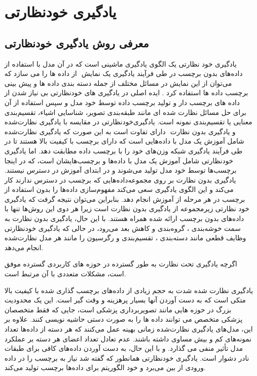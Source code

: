 \clearpage
{}
\chapter{یادگیری خودنظارتی}

\section{معرفی روش یادگیری خودنظارتی}

یادگیری خود نظارتی یک الگوی یادگیری ماشینی است که در آن مدل با استفاده از داده‌های بدون برچسب در طی فرآیند یادگیری یک نمایش ‌ از داده ها را می سازد که می‌توان از این نمایش در مسائل مختلف از جمله دسته بندی داده ها و پیش بینی برچسب داده ها استفاده کرد .
ایده اصلی در یادگیری های خودنظارتی بی‌ نیاز شدن از داده های برچسب دار و تولید برچسب داده توسط خود مدل و سپس استفاده از آن برای حل مسائل نظارت شده
ای  مانند طبقه‌بندی تصویر، شناسایی اشیاء، تقسیم‌بندی معنایی یا تقسیم‌بندی نمونه است.
 \citep{jaiswal2020survey}
یادگیری‌خودنظارتی در مقایسه با یادگیری نظارت‌شده‌  و یادگیری بدون نظارت ‌ دارای تفاوت است به این صورت که یادگیری نظارت‌شده شامل آموزش یک مدل با داده‌هایی است که دارای برچسب با کیفیت بالا هستند تا در طی فرآیند یادگیری شبکه وزن‌های خود را با برچسب داده مطابقت دهد. اما
یادگیری خودنظارتی  شامل آموزش یک مدل با داده‌ها و برچسب‌هایشان است، که در اینجا برچسب‌ها توسط خود مدل تولید می‌شوند و در ابتدای آموزش در دسترس نیستند.
یادگیری بدون نظارت بر روی مجموعه‌داده‌هایی که برچسب در دسترس ندارند کار می‌کند و این الگوی یادگیری سعی می‌کند مفهوم‌سازی داده‌ها را بدون استفاده از برچسب در هر مرحله از آموزش انجام دهد.\citep{zhai2019s4l}
بنابراین می‌توان نتیجه گرفت که یادگیری خود نظارتی  زیرمجموعه از یادگیری بدون نظارت است زیرا هر دوی این روش‌ها تنها با داده‌های بدون برچسب ارائه شده همراه هستند. با این حال، یادگیری بدون نظارت به سمت خوشه‌بندی‌ ، گروه‌بندی و کاهش بعد‌  می‌رود، در حالی که یادگیری خودنظارتی وظایف قطعی مانند دسته‌بندی‌ ، تقسیم‌بندی و رگرسیون‌  را مانند هر مدل نظارت‌شده انجام می‌دهد.

اگرچه یادگیری تحت نظارت به طور گسترده در حوزه های کاربردی گسترده موفق است، مشکلات متعددی با آن مرتبط است.

یادگیری نظارت شده شدت به حجم زیادی از داده‌های برچسب گذاری شده با کیفیت بالا متکی است که به دست آوردن آنها بسیار پرهزینه و وقت گیر است. این یک محدودیت بزرگ در حوزه هایی مانند تصویربرداری پزشکی است، جایی که فقط متخصصان پزشکی متخصص می توانند داده ها را به صورت دستی حاشیه نویسی کنند.
علاوه بر این، مدل‌های یادگیری نظارت‌شده زمانی بهینه عمل می‌کنند که هر دسته از داده‌ها تعداد نمونه‌های کم و بیش مساوی داشته باشند. عدم تعادل تعداد اعضای هر دسته بر عملکرد مدل تأثیر منفی می گذارد. و با این حال، به دست آوردن داده‌های کافی برای طبقات نادر دشوار است. یادگیری خودنظارتی همانطور که گفته شد نیاز به برچسب را در داده ورودی از بین می‌برد و خود الگوریتم برای داده‌ها برچسب تولید می‌کند.
 \citep{misra2020self}

